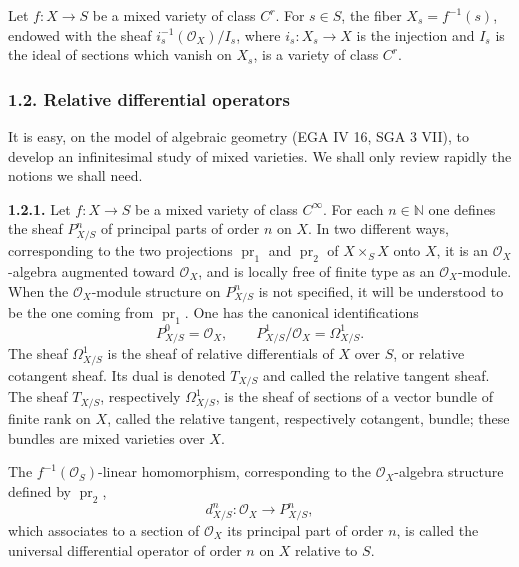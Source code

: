 \documentclass[11pt]{article}
\begin{document}
Let $f:X\to S$ be a mixed variety of class $C^r$. For $s\in S$, the fiber $X_s=f^{-1}(s)$, endowed with the sheaf $i_s^{-1}(\mathcal O_X)/I_s$, where $i_s:X_s\to X$ is the injection and $I_s$ is the ideal of sections which vanish on $X_s$, is a variety of class $C^r$.

\subsubsection*{1.2. Relative differential operators}

It is easy, on the model of algebraic geometry (EGA IV 16, SGA 3 VII), to develop an infinitesimal study of mixed varieties. We shall only review rapidly the notions we shall need.

\textbf{1.2.1.} Let $f:X\to S$ be a mixed variety of class $C^\infty$. For each $n\in\mathbb N$ one defines the sheaf $P^n_{X/S}$ of principal parts of order $n$ on $X$. In two different ways, corresponding to the two projections $\operatorname{pr}_1$ and $\operatorname{pr}_2$ of $X\times_SX$ onto $X$, it is an $\mathcal O_X$-algebra augmented toward $\mathcal O_X$, and is locally free of finite type as an $\mathcal O_X$-module. When the $\mathcal O_X$-module structure on $P^n_{X/S}$ is not specified, it will be understood to be the one coming from $\operatorname{pr}_1$. One has the canonical identifications
\[
 P^0_{X/S}=\mathcal O_X,
 \qquad
 P^1_{X/S}/\mathcal O_X=\Omega^1_{X/S}.
\]
The sheaf $\Omega^1_{X/S}$ is the sheaf of relative differentials of $X$ over $S$, or relative cotangent sheaf. Its dual is denoted $T_{X/S}$ and called the relative tangent sheaf. The sheaf $T_{X/S}$, respectively $\Omega^1_{X/S}$, is the sheaf of sections of a vector bundle of finite rank on $X$, called the relative tangent, respectively cotangent, bundle; these bundles are mixed varieties over $X$.

The $f^{-1}(\mathcal O_S)$-linear homomorphism, corresponding to the $\mathcal O_X$-algebra structure defined by $\operatorname{pr}_2$,
\[
 d^n_{X/S}:\mathcal O_X\longrightarrow P^n_{X/S},
\]
which associates to a section of $\mathcal O_X$ its principal part of order $n$, is called the universal differential operator of order $n$ on $X$ relative to $S$.
\end{document}
